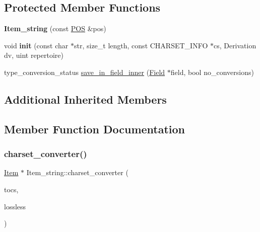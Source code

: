 \subsection*{Protected Member Functions}
\begin{DoxyCompactItemize}
\item 
\mbox{\label{classItem__string_a291d8b0bf5de46c335648eb7e9f03c4b}} 
{\bfseries Item\+\_\+string} (const \mbox{\hyperlink{structYYLTYPE}{P\+OS}} \&pos)
\item 
\mbox{\label{classItem__string_a39207bf2b85a99fbe28c8c5094d6929d}} 
void {\bfseries init} (const char $\ast$str, size\+\_\+t length, const C\+H\+A\+R\+S\+E\+T\+\_\+\+I\+N\+FO $\ast$cs, Derivation dv, uint repertoire)
\item 
type\+\_\+conversion\+\_\+status \mbox{\hyperlink{classItem__string_aafcfb45c5e610f75790ea91fded1dcc7}{save\+\_\+in\+\_\+field\+\_\+inner}} (\mbox{\hyperlink{classField}{Field}} $\ast$field, bool no\+\_\+conversions)
\end{DoxyCompactItemize}
\subsection*{Additional Inherited Members}


\subsection{Member Function Documentation}
\mbox{\label{classItem__string_aa4c57929e17aaf021d8d31bf4d61a994}} 
\subsubsection{\texorpdfstring{charset\+\_\+converter()}{charset\_converter()}}
{\footnotesize\ttfamily \mbox{\hyperlink{classItem}{Item}} $\ast$ Item\+\_\+string\+::charset\+\_\+converter (\begin{DoxyParamCaption}\item[{const C\+H\+A\+R\+S\+E\+T\+\_\+\+I\+N\+FO $\ast$}]{tocs,  }\item[{bool}]{lossless }\end{DoxyParamCaption})}


